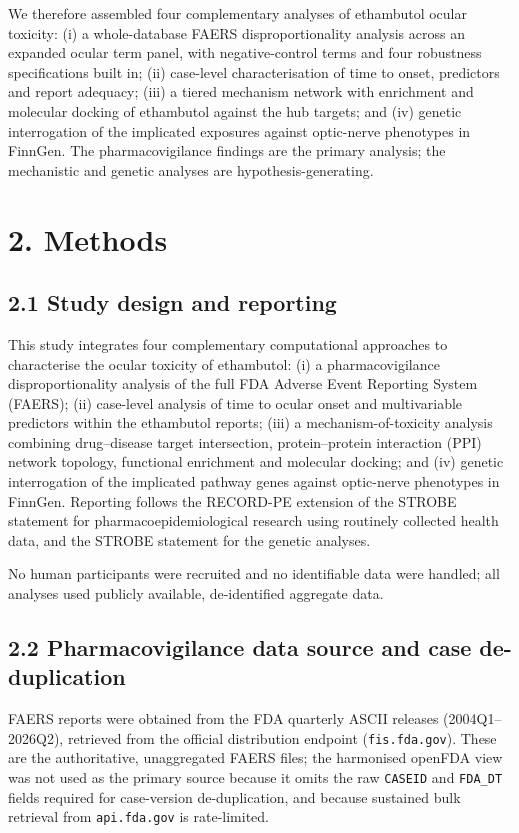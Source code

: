 \documentclass[utf8]{FrontiersinVancouver}
\begin{document}
We therefore assembled four complementary analyses of ethambutol ocular toxicity: (i) a whole-database FAERS disproportionality analysis across an expanded ocular term panel, with negative-control terms and four robustness specifications built in; (ii) case-level characterisation of time to onset, predictors and report adequacy; (iii) a tiered mechanism network with enrichment and molecular docking of ethambutol against the hub targets; and (iv) genetic interrogation of the implicated exposures against optic-nerve phenotypes in FinnGen. The pharmacovigilance findings are the primary analysis; the mechanistic and genetic analyses are hypothesis-generating.

\section{2. Methods}

\subsection{2.1 Study design and reporting}

This study integrates four complementary computational approaches to characterise the ocular toxicity of ethambutol: (i) a pharmacovigilance disproportionality analysis of the full FDA Adverse Event Reporting System (FAERS); (ii) case-level analysis of time to ocular onset and multivariable predictors within the ethambutol reports; (iii) a mechanism-of-toxicity analysis combining drug--disease target intersection, protein--protein interaction (PPI) network topology, functional enrichment and molecular docking; and (iv) genetic interrogation of the implicated pathway genes against optic-nerve phenotypes in FinnGen. Reporting follows the RECORD-PE extension of the STROBE statement for pharmacoepidemiological research using routinely collected health data, and the STROBE statement for the genetic analyses.

No human participants were recruited and no identifiable data were handled; all analyses used publicly available, de-identified aggregate data.

\subsection{2.2 Pharmacovigilance data source and case de-duplication}

FAERS reports were obtained from the FDA quarterly ASCII releases (2004Q1--2026Q2), retrieved from the official distribution endpoint (\texttt{fis.fda.gov}). These are the authoritative, unaggregated FAERS files; the harmonised openFDA view was not used as the primary source because it omits the raw \texttt{CASEID} and \texttt{FDA\_DT} fields required for case-version de-duplication, and because sustained bulk retrieval from \texttt{api.fda.gov} is rate-limited.
\end{document}
